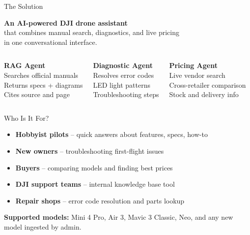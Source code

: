 \documentclass[aspectratio=169]{beamer}
\begin{document}
\begin{frame}{The Solution}
\begin{center}
\Large\textbf{An AI-powered DJI drone assistant}\\[0.5em]
\normalsize that combines manual search, diagnostics, and live pricing\\in one conversational interface.
\end{center}

\vspace{1em}

\begin{columns}
\centering
\textbf{RAG Agent}\\[0.3em]
\small Searches official manuals\\
Returns specs + diagrams\\
Cites source and page

\centering
\textbf{Diagnostic Agent}\\[0.3em]
\small Resolves error codes\\
LED light patterns\\
Troubleshooting steps

\centering
\textbf{Pricing Agent}\\[0.3em]
\small Live vendor search\\
Cross-retailer comparison\\
Stock and delivery info
\end{columns}
\end{frame}

\begin{frame}{Who Is It For?}
\begin{itemize}
  \item \textbf{Hobbyist pilots} -- quick answers about features, specs, how-to
  \item \textbf{New owners} -- troubleshooting first-flight issues
  \item \textbf{Buyers} -- comparing models and finding best prices
  \item \textbf{DJI support teams} -- internal knowledge base tool
  \item \textbf{Repair shops} -- error code resolution and parts lookup
\end{itemize}

\vspace{1em}
\textbf{Supported models:} Mini 4 Pro, Air 3, Mavic 3 Classic, Neo, and any new model ingested by admin.
\end{frame}
\end{document}
